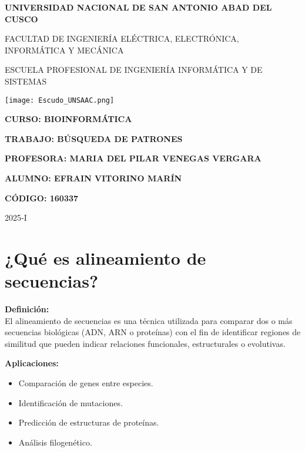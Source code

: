 \documentclass[fleqn,10pt]{article}
\begin{document}
\begin{titlepage}
    \centering
    \vspace*{1cm}
    {\LARGE\bfseries UNIVERSIDAD NACIONAL DE SAN ANTONIO ABAD DEL CUSCO\par}
    \vspace{0.5cm}
    {\Large FACULTAD DE INGENIERÍA ELÉCTRICA, ELECTRÓNICA, INFORMÁTICA Y MECÁNICA\par}
    \vspace{0.5cm}
    {\Large ESCUELA PROFESIONAL DE INGENIERÍA INFORMÁTICA Y DE SISTEMAS\par}
    \vfill
    \texttt{[image: Escudo\_UNSAAC.png]}\par
    \vfill
    {\Large\bfseries CURSO: BIOINFORMÁTICA\par}
    \vspace{0.3cm}
    {\Large\bfseries TRABAJO: BÚSQUEDA DE PATRONES\par}
    \vspace{0.3cm}
    {\Large\bfseries PROFESORA: MARIA DEL PILAR VENEGAS VERGARA\par}
    \vspace{1cm}
    {\Large\bfseries ALUMNO: EFRAIN VITORINO MARÍN\par}
    {\Large\bfseries CÓDIGO: 160337\par}
    \vfill
    {\Large 2025‑I\par}
\end{titlepage}

\setcounter{page}{1}
\pagestyle{plain}
\tableofcontents
\newpage


\section{¿Qué es alineamiento de secuencias?}
\textbf{Definición:} \\
El alineamiento de secuencias es una técnica utilizada para comparar dos o más secuencias biológicas (ADN, ARN o proteínas) con el fin de identificar regiones de similitud que pueden indicar relaciones funcionales, estructurales o evolutivas.

\textbf{Aplicaciones:}
\begin{itemize}
    \item Comparación de genes entre especies.
    \item Identificación de mutaciones.
    \item Predicción de estructuras de proteínas.
    \item Análisis filogenético.
\end{itemize}
\end{document}
